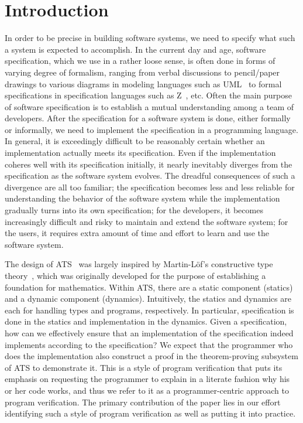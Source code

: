 \documentclass{llncs}
\begin{document}
\section{Introduction}\label{section:introduction}
In order to be precise in building software systems, we need to specify
what such a system is expected to accomplish. In the current day and age,
software specification, which we use in a rather loose sense, is often done
in forms of varying degree of formalism, ranging from verbal discussions to
pencil/paper drawings to various diagrams in modeling languages such as
UML~\cite{Rayner2005OMG} to formal specifications in specification
languages such as Z~\cite{z:spiv92}, etc. Often the main purpose of
software specification is to establish a mutual understanding among a team
of developers.  After the specification for a software system is done,
either formally or informally, we need to implement the specification in a
programming language.  In general, it is exceedingly difficult to be
reasonably certain whether an implementation actually meets its
specification. Even if the implementation coheres well with its
specification initially, it nearly inevitably diverges from the
specification as the software system evolves. The dreadful consequences of
such a divergence are all too familiar; the specification becomes less and
less reliable for understanding the behavior of the software system while
the implementation gradually turns into its own specification; for the
developers, it becomes increasingly difficult and risky to maintain and
extend the software system; for the users, it requires extra amount of
time and effort to learn and use the software system.

The design of ATS~\cite{ATS-types03,ATSweb} was largely inspired by
Martin-L{\"o}f's constructive type theory~\cite{martinlof85}, which was
originally developed for the purpose of establishing a foundation for
mathematics.  Within ATS, there are a static component (statics) and a
dynamic component (dynamics). Intuitively, the statics and dynamics are
each for handling types and programs, respectively. In particular,
specification is done in the statics and implementation in the
dynamics. Given a specification, how can we effectively ensure that an
implementation of the specification indeed implements according to the
specification?  We expect that the programmer who does the implementation
also construct a proof in the theorem-proving subsystem of ATS to
demonstrate it.  This is a style of program verification that puts its
emphasis on requesting the programmer to explain in a literate fashion why
his or her code works, and thus we refer to it as a programmer-centric
approach to program verification. The primary contribution of the paper
lies in our effort identifying such a style of program verification as well
as putting it into practice.
\end{document}
